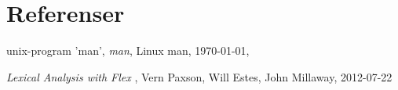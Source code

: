 \section{Referenser}
\begin{thebibliography}{999}

            unix-program 'man',
                        \emph{man},
                                        Linux man,
                                                            \today,



    \textit{Lexical Analysis with Flex} , Vern Paxson, Will Estes, John Millaway, 2012-07-22
    \end{thebibliography}
